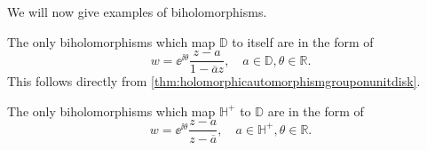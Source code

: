 We will now give examples of biholomorphisms.
\begin{example}
    The only biholomorphisms which map \(\mathbb{D}\) to itself are in the form of
    \begin{equation}
        w=\ee^{\ii\theta}\frac{z-a}{1-\overline{a}z},\quad a\in\mathbb{D},\theta\in\mathbb{R}.\label{eq:biholomorphismunitdiskautomorphism}
    \end{equation}
    This follows directly from \cref{thm:holomorphicautomorphismgrouponunitdisk}.
\end{example}
\begin{example}\label{ex:biholomorphismsupperhalfplanetounitdisk}
    The only biholomorphisms which map \(\mathbb{H}^+\) to \(\mathbb{D}\) are in the form of
    \begin{equation}
        w=\ee^{\ii\theta}\frac{z-a}{z-\overline{a}},\quad a\in\mathbb{H}^+,\theta\in\mathbb{R}.\label{eq:biholomorphismunitdisktoupperhalfplane}
    \end{equation}
\end{example}
